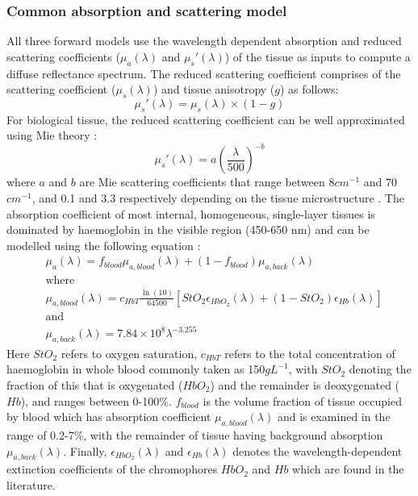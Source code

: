 \subsubsection{Common absorption and scattering model}\label{sec:opticproperties}
All three forward models use the wavelength dependent absorption and reduced scattering coefficients ($\mu_a(\lambda)$ and $\mu_s'(\lambda)$) of the tissue as inputs
to compute a
diffuse reflectance spectrum. 
The reduced scattering coefficient comprises of the scattering coefficient ($\mu_s(\lambda)$) and tissue anisotropy ($g$) as follows: 
\begin{equation}
    \mu_s'(\lambda) = \mu_s(\lambda) \times (1-g)
    \label{eq:reducedscattering}
\end{equation}
For biological tissue, the reduced scattering coefficient can be well approximated using Mie theory \cite{Jacques2013}: 
\begin{equation}
    \mu_s'(\lambda) = a(\frac{\lambda}{500})^{-b}
    \label{eq:Mie}
\end{equation}
where $a$ and $b$ are Mie scattering coefficients that range between 8\textrm{$cm^{-1}$} and 70\textrm{$cm^{-1}$}, and 0.1 and 3.3 respectively depending on the tissue microstructure \cite{Jacques2013}. 
The absorption coefficient of most internal, homogeneous, single-layer tissues is dominated by haemoglobin in the visible region (450-650 nm)\cite{JacquesAbs} and can be modelled using the following equation \cite{Yudovsky2009}: 
\begin{equation}
\begin{aligned}
    & \mu_a(\lambda) = f_{blood}\mu_{a, blood}(\lambda) + (1 - f_{blood})\mu_{a, back}(\lambda) \\
    & \textrm{where} \\
    & \mu_{a, blood}(\lambda) = c_{HbT}\frac{\ln(10)}{64500}[StO_2 \epsilon_{HbO_2}(\lambda) + (1 - StO_2)\epsilon_{Hb}(\lambda)] \\
    & \textrm{and} \\
    & \mu_{a, back}(\lambda) = 7.84\times10^8 \lambda^{-3.255}
\end{aligned}
\label{eq:mua}
\end{equation}
Here $StO_2$ refers to oxygen saturation, $c_{HbT}$ refers to the total concentration of haemoglobin in whole blood commonly taken as 150\textrm{$gL^{-1}$}\cite{Prahl1999}, with $StO_2$ denoting the fraction of this that is oxygenated ($HbO_2$) and the remainder is deoxygenated ($Hb$), and ranges between 0-100\%\cite{Yudovsky2009}. $f_{blood}$ is the volume fraction of tissue occupied by blood which has absorption coefficient $\mu_{a, blood}(\lambda)$ and is examined in the range of 0.2-7\%\cite{Yudovsky2009}, with the remainder of tissue having background absorption $\mu_{a, back}(\lambda)$\cite{Yudovsky2009}.
Finally, $\epsilon_{HbO_2}(\lambda)$ and $\epsilon_{Hb}(\lambda)$ denotes the wavelength-dependent extinction coefficients of the chromophores $HbO_2$ and $Hb$ which are found in the literature\cite{Prahl1999}. 

